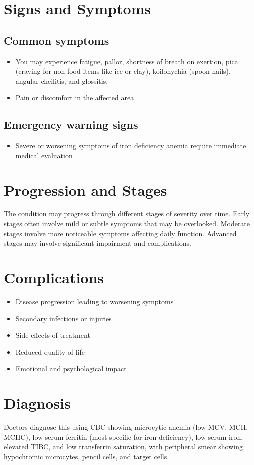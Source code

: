 \section{Signs and Symptoms}
\subsection{Common symptoms}
\begin{itemize}[noitemsep]
  \item You may experience fatigue, pallor, shortness of breath on exertion, pica (craving for non-food items like ice or clay), koilonychia (spoon nails), angular cheilitis, and glossitis.
  \item Pain or discomfort in the affected area
  \end{itemize}
\subsection{Emergency warning signs}
\begin{itemize}[noitemsep]
  \item Severe or worsening symptoms of iron deficiency anemia require immediate medical evaluation
\end{itemize}
\section{Progression and Stages}
The condition may progress through different stages of severity over time. Early stages often involve mild or subtle symptoms that may be overlooked. Moderate stages involve more noticeable symptoms affecting daily function. Advanced stages may involve significant impairment and complications.
\section{Complications}
\begin{itemize}[noitemsep]
  \item Disease progression leading to worsening symptoms
  \item Secondary infections or injuries
  \item Side effects of treatment
  \item Reduced quality of life
  \item Emotional and psychological impact
\end{itemize}
\section{Diagnosis}
Doctors diagnose this using CBC showing microcytic anemia (low MCV, MCH, MCHC), low serum ferritin (most specific for iron deficiency), low serum iron, elevated TIBC, and low transferrin saturation, with peripheral smear showing hypochromic microcytes, pencil cells, and target cells.

